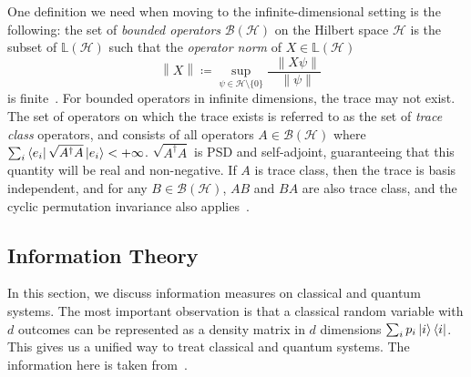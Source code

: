 \documentclass[10pt, a4paper]{article}
\numberwithin{equation}{section} %
\theoremstyle{definition}
\theoremstyle{plain}
\newcommand{\norm}[1]{\mathop{}\left\lVert#1\right\rVert}
\newcommand{\?}{\mathrel{?}} %
\newcommand{\Lin}[1]{\mathbb{L}\left(#1\right)}
\newcommand{\Hs}{\mathcal{H}} %
\begin{document}
\begin{appendices}
                  One definition we need when moving to the infinite-dimensional setting is the following: the set of \emph{bounded operators} \(\mathcal{B}(\Hs)\) on the Hilbert space \(\Hs\) is the subset of \(\Lin{\Hs}\) such that the \emph{operator norm} of \(X \in \Lin{\Hs}\)
    \begin{equation}
    \norm{X} \coloneqq \sup_{\psi \in \Hs \setminus \{0\}} \frac{\norm{X\psi}}{\norm{\psi}}
  \end{equation}
  is finite~\cite{HallQuantumForMath}. For bounded operators in infinite dimensions, the trace may not exist. The set of operators on which the trace exists is referred to as the set of \emph{trace class} operators, and consists of all operators \(A \in \mathcal{B}(\Hs)\) where \(\sum_i \bra{e_i}\sqrt{A^{\dagger}A}\ket{e_i} < +\infty\). \(\sqrt{A^{\dagger}A}\) is PSD and self-adjoint, guaranteeing that this quantity will be real and non-negative. If \(A\) is trace class, then the trace is basis independent, and for any \(B \in \mathcal{B}(\Hs)\), \(AB\) and \(BA\) are also trace class, and the cyclic permutation invariance also applies~\cite[Sec. 19.2]{HallQuantumForMath}.

                    \subsection{Information Theory}\label{sec:prelim_infot}

                    In this section, we discuss information measures on classical and quantum systems. The most important observation is that a classical random variable with \(d\) outcomes can be represented as a density matrix in \(d\) dimensions \(\sum_i p_i \ket{i}\bra{i}\). This gives us a unified way to treat classical and quantum systems. The information here is taken from~\cite{NielsenChuang,ElemInfo}.


\end{appendices}
\end{document}
